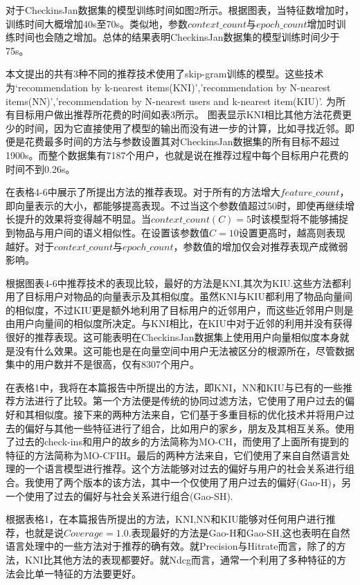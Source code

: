 \documentclass[UTF8]{ctexart}
\begin{document}
	对于CheckinsJan数据集的模型训练时间如图2所示。根据图表，当特征数增加时，训练时间大概增加40s至70s。类似地，参数$context\_count$与$epoch\_count$增加时训练时间也会随之增加。总体的结果表明CheckinsJan数据集的模型训练时间少于75s。
	
	本文提出的共有3种不同的推荐技术使用了skip-gram训练的模型。这些技术为‘recommendation by k-nearest items(KNI)’,'recommendation by N-nearest items(NN)','recommendation by N-nearest users and k-nearest item(KIU)'. 为所有目标用户做出推荐所花费的时间如表3所示。 图表显示KNI相比其他方法花费更少的时间，因为它直接使用了模型的输出而没有进一步的计算，比如寻找近邻。即便是花费最多时间的方法与参数设置其对CheckinsJan数据集的所有目标不超过1900s。而整个数据集有7187个用户，也就是说在推荐过程中每个目标用户花费的时间不到0.26s。
	
	在表格4-6中展示了所提出方法的推荐表现。对于所有的方法增大$feature\_count$，即向量表示的大小，都能够提高表现。不过当这个参数值超过50时，即使再继续增长提升的效果将变得越不明显。当$context\_count\left(C\right)=5$时该模型将不能够捕捉到物品与用户间的语义相似性。在设置该参数值$C=10$设置更高时，越高则表现越好。对于$context\_count$与$epoch\_count$，参数值的增加仅会对推荐表现产成微弱影响。
	
	根据图表4-6中推荐技术的表现比较，最好的方法是KNI,其次为KIU.这些方法都利用了目标用户对物品的向量表示及其相似度。虽然KNI与KIU都利用了物品向量间的相似度，不过KIU更是额外地利用了目标用户的近邻用户，而这些近邻用户则是由用户向量间的相似度所决定。与KNI相比，在KIU中对于近邻的利用并没有获得很好的推荐表现。这可能表明在CheckinsJan数据集上使用用户向量相似度本身就是没有什么效果。这可能也是在向量空间中用户无法被区分的根源所在，尽管数据集中的用户数并不是很高，仅有8307个用户。
	
	在表格1中，我将在本篇报告中所提出的方法，即KNI，NN和KIU与已有的一些推荐方法进行了比较。第一个方法便是传统的协同过滤方法，它使用了用户过去的偏好和其相似度。接下来的两种方法来自\cite{ozsoy2014multi}，它们基于多重目标的优化技术并将用户过去的偏好与其他一些特征进行了组合，比如用户的家乡，朋友及其相互关系。使用了过去的check-ins和用户的故乡的方法简称为MO-CH，而使用了上面所有提到的特征的方法简称为MO-CFIH。最后的两种方法来自\cite{gao2012exploring}，它们使用了来自自然语言处理的一个语言模型进行推荐。这个方法能够对过去的偏好与用户的社会关系进行组合。我使用了两个版本的该方法，其中一个仅使用了用户过去的偏好(Gao-H)，另一个使用了过去的偏好与社会关系进行组合(Gao-SH).
	
	根据表格1，在本篇报告所提出的方法，KNI,NN和KIU能够对任何用户进行推荐，也就是说$Coverage=1.0$.表现最好的方法是Gao-H和Gao-SH,这也表明在自然语言处理中的一些方法对于推荐的确有效。就Precision与Hitrate而言，除了\cite{gao2012exploring}的方法，KNI比其他方法的表现都要好。就Ndcg而言，通常一个利用了多种特征的方法会比单一特征的方法要更好。
	
\end{document}
